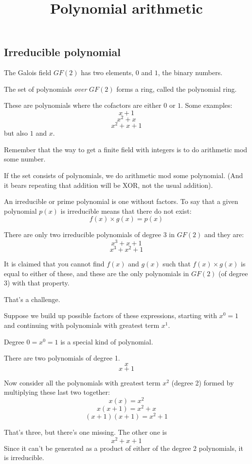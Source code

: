 \documentclass[11pt, oneside]{article}
\title{Polynomial arithmetic}
\date{}
\begin{document}
\maketitle

\Large

\subsection*{Irreducible polynomial}

The Galois field $GF(2)$ has two elements, $0$ and $1$, the binary numbers.  

The set of polynomials \emph{over} $GF(2)$ forms a ring, called the polynomial ring.

These are polynomials where the cofactors are either $0$ or $1$.  Some examples:
\[ x + 1 \]
\[ x^2 + x \]
\[ x^2 + x + 1 \]
but also $1$ and $x$.

Remember that the way to get a finite field with integers is to do arithmetic mod some number.  

If the set consists of polynomials, we do arithmetic mod some polynomial.  (And it bears repeating that addition will be XOR, not the usual addition).

An irreducible or prime polynomial is one without factors.  To say that a given polynomial $p(x)$ is irreducible means that there do not exist:
\[ f(x) \times g(x) = p(x) \]

There are only two irreducible polynomials of degree 3 in $GF(2)$ and they are:
\[ x^3 + x + 1 \]
\[ x^3 + x^2 + 1 \]

It is claimed that you cannot find $f(x)$ and $g(x)$ such that $f(x) \times g(x)$ is equal to either of these, and these are the only polynomials in $GF(2)$ (of degree 3) with that property.

That's a challenge.  

Suppose we build up possible factors of these expressions, starting with $x^0 = 1$ and continuing with polynomials with greatest term $x^1$.  

Degree $0 = x^0 = 1$ is a special kind of polynomial.

There are two polynomials of degree 1.
\[ x \]
\[ x + 1 \]

Now consider all the polynomials with greatest term $x^2$ (degree 2) formed by multiplying these last two together:
\[ x (x) = x^2 \]
\[ x (x + 1) = x^2 + x \]
\[ (x + 1)(x + 1) = x^2 + 1 \]

That's three, but there's one missing.  The other one is
\[ x^2 + x + 1 \]
Since it can't be generated as a product of either of the degree 2 polynomials, it is irreducible.
\end{document}
